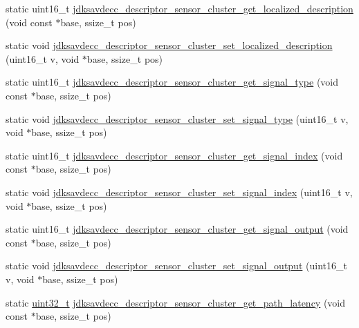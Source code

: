 \begin{DoxyCompactItemize}
\item 
static uint16\+\_\+t \hyperlink{group__descriptor__sensor__cluster_ga2539040ea8413b4404529208b6a17a9c}{jdksavdecc\+\_\+descriptor\+\_\+sensor\+\_\+cluster\+\_\+get\+\_\+localized\+\_\+description} (void const $\ast$base, ssize\+\_\+t pos)
\item 
static void \hyperlink{group__descriptor__sensor__cluster_ga2b589ec646e76ad0d3117513741714a4}{jdksavdecc\+\_\+descriptor\+\_\+sensor\+\_\+cluster\+\_\+set\+\_\+localized\+\_\+description} (uint16\+\_\+t v, void $\ast$base, ssize\+\_\+t pos)
\item 
static uint16\+\_\+t \hyperlink{group__descriptor__sensor__cluster_ga466d87386a21a3b07ce5a629964cd650}{jdksavdecc\+\_\+descriptor\+\_\+sensor\+\_\+cluster\+\_\+get\+\_\+signal\+\_\+type} (void const $\ast$base, ssize\+\_\+t pos)
\item 
static void \hyperlink{group__descriptor__sensor__cluster_ga77ac0615868a207554b23f571195b555}{jdksavdecc\+\_\+descriptor\+\_\+sensor\+\_\+cluster\+\_\+set\+\_\+signal\+\_\+type} (uint16\+\_\+t v, void $\ast$base, ssize\+\_\+t pos)
\item 
static uint16\+\_\+t \hyperlink{group__descriptor__sensor__cluster_gac4019e46ff339e8569dc5aa57ae6789b}{jdksavdecc\+\_\+descriptor\+\_\+sensor\+\_\+cluster\+\_\+get\+\_\+signal\+\_\+index} (void const $\ast$base, ssize\+\_\+t pos)
\item 
static void \hyperlink{group__descriptor__sensor__cluster_ga84100f9d57d30ea2f783ce49c013f598}{jdksavdecc\+\_\+descriptor\+\_\+sensor\+\_\+cluster\+\_\+set\+\_\+signal\+\_\+index} (uint16\+\_\+t v, void $\ast$base, ssize\+\_\+t pos)
\item 
static uint16\+\_\+t \hyperlink{group__descriptor__sensor__cluster_ga57941a09c67d7bfcedc9ed4d9cf04789}{jdksavdecc\+\_\+descriptor\+\_\+sensor\+\_\+cluster\+\_\+get\+\_\+signal\+\_\+output} (void const $\ast$base, ssize\+\_\+t pos)
\item 
static void \hyperlink{group__descriptor__sensor__cluster_gaa4be2f9695dca82414db9877235ed55c}{jdksavdecc\+\_\+descriptor\+\_\+sensor\+\_\+cluster\+\_\+set\+\_\+signal\+\_\+output} (uint16\+\_\+t v, void $\ast$base, ssize\+\_\+t pos)
\item 
static \hyperlink{parse_8c_a6eb1e68cc391dd753bc8ce896dbb8315}{uint32\+\_\+t} \hyperlink{group__descriptor__sensor__cluster_gaa33f8462a17443fef613bb10be518a6a}{jdksavdecc\+\_\+descriptor\+\_\+sensor\+\_\+cluster\+\_\+get\+\_\+path\+\_\+latency} (void const $\ast$base, ssize\+\_\+t pos)
\item 

\end{DoxyCompactItemize}
